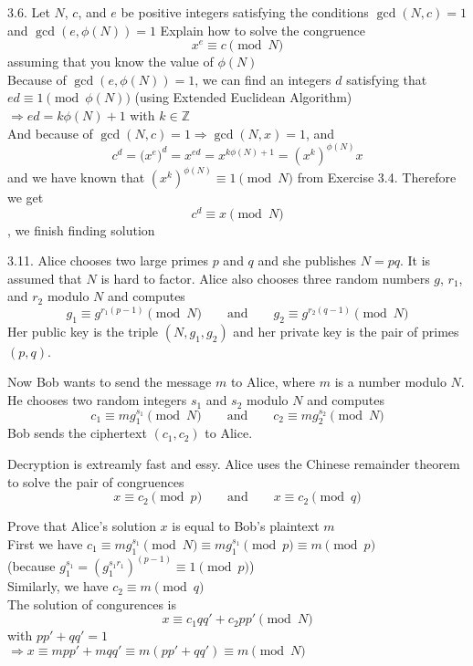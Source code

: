 3.6. Let $N$, $c$, and $e$ be positive integers satisfying the conditions $\gcd(N,c)=1$ and $\gcd(e,\phi(N))=1$
		 Explain how to solve the congruence \[x^e \equiv c \pmod{N}\] assuming that you know the value of $\phi(N)$ \\ Because of $\gcd(e, \phi(N)) = 1$, we can find an integers $d$ satisfying that $ed \equiv 1 \pmod{\phi(N)}$ (using Extended Euclidean Algorithm) \\ $\Rightarrow ed = k\phi(N) + 1$ with $k \in \mathbb{Z}$ \\ And because of $\gcd(N, c)=1 \Rightarrow \gcd(N,x)=1$, and \[c^d = \Big(x^e\Big)^d = x^{ed} = x^{k\phi(N) + 1} = (x^k)^{\phi(N)}x\] and we have known that $(x^k)^{\phi(N)} \equiv 1 \pmod{N}$ from Exercise 3.4. Therefore we get \[c^d \equiv x \pmod{N}\], we finish finding solution
	


3.11. Alice chooses two large primes $p$ and $q$ and she publishes $N=pq$. It is assumed that $N$ is hard to factor. Alice also chooses three random numbers $g$, $r_1$, and $r_2$ modulo $N$ and computes $$g_1 \equiv g^{r_1(p-1)} \pmod{N} \qquad \text{and} \qquad g_2 \equiv g^{r_2(q-1)} \pmod{N}$$ Her public key is the triple $(N, g_1, g_2)$ and her private key is the pair of primes $(p, q)$.
	
	Now Bob wants to send the message $m$ to Alice, where $m$ is a number modulo $N$. He chooses two random integers $s_1$ and $s_2$ modulo $N$ and computes $$c_1 \equiv mg_1^{s_1} \pmod{N} \qquad \text{and} \qquad c_2 \equiv mg_2^{s_2} \pmod{N}$$ Bob sends the ciphertext $(c_1, c_2)$ to Alice.
	
	Decryption is extreamly fast and essy. Alice uses the Chinese remainder theorem to solve the pair of congruences \[x \equiv c_2 \pmod{p} \qquad \text{and} \qquad x \equiv c_2 \pmod{q}\]
		
	Prove that Alice's solution $x$ is equal to Bob's plaintext $m$ \\ First we have $c_1 \equiv mg_1^{s_1} \pmod{N} \equiv mg_1^{s_1} \pmod{p} \equiv m \pmod{p}$ \\ (because $g_1^{s_1} = (g_1^{s_1 r_1})^{(p-1)} \equiv 1 \pmod{p}$) \\ Similarly, we have $c_2 \equiv m \pmod{q}$ \\ The solution of congurences is \[x \equiv c_1 q q' + c_2 p p' \pmod N\] with $p p' + q q' = 1$ \\ $\Rightarrow x \equiv m p p' + m q q' \equiv m(p p' + q q') \equiv m \pmod N$
		 
